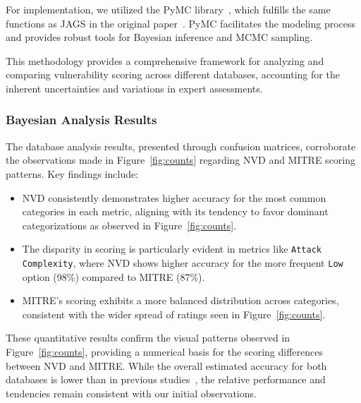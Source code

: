 \documentclass[12pt]{article}
\begin{document}
For implementation, we utilized the PyMC library~\cite{pymc}, which fulfills the same functions as
JAGS in the original paper~\cite{bayes}. PyMC facilitates the modeling process and provides robust
tools for Bayesian inference and MCMC sampling.

This methodology provides a comprehensive framework for analyzing and comparing vulnerability
scoring across different databases, accounting for the inherent uncertainties and variations in
expert assessments.


\subsubsection{Bayesian Analysis Results}

The database analysis results, presented through confusion matrices, corroborate the observations
made in Figure~\ref{fig:counts} regarding NVD and MITRE scoring patterns. Key findings include:

\begin{itemize}
	\item NVD consistently demonstrates higher accuracy for the most common categories in each metric,
	      aligning with its tendency to favor dominant categorizations as observed in Figure~\ref{fig:counts}.

	\item The disparity in scoring is particularly evident in metrics like \texttt{Attack Complexity}, where
	      NVD shows higher accuracy for the more frequent \texttt{Low} option (98\%) compared to
	      MITRE (87\%).

	\item MITRE's scoring exhibits a more balanced distribution across categories, consistent with the wider
	      spread of ratings seen in Figure~\ref{fig:counts}.
\end{itemize}

These quantitative results confirm the visual patterns observed in Figure~\ref{fig:counts},
providing a numerical basis for the scoring differences between NVD and MITRE. While the overall
estimated accuracy for both databases is lower than in previous studies~\cite{bayes}, the relative
performance and tendencies remain consistent with our initial observations.

\bigskip
\end{document}
